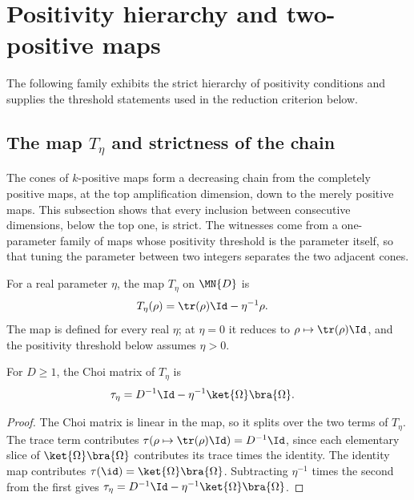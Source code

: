 \section{Positivity hierarchy and two-positive maps}

The following family exhibits the strict hierarchy of positivity conditions
and supplies the threshold statements used in the reduction criterion below.

\subsection{The map \texorpdfstring{$T_\eta$}{T eta} and strictness of the chain}

The cones of $k$-positive maps form a decreasing chain from the completely
positive maps, at the top amplification dimension, down to the merely positive
maps. This subsection shows that every inclusion between consecutive
dimensions, below the top one, is strict. The witnesses come from a
one-parameter family of maps whose positivity threshold is the parameter
itself, so that tuning the parameter between two integers separates the two
adjacent cones.

\begin{definition}
    \label{def:t_eta}
    \leanok
    For a real parameter $\eta$, the map $T_\eta$ on $\MN{D}$ is
    \begin{align}
        T_\eta(\rho) & =\tr(\rho) \Id-\eta^{-1}\rho.
        \notag
    \end{align}
    The map is defined for every real $\eta$; at $\eta=0$ it reduces to
    $\rho\mapsto\tr(\rho) \Id$, and the positivity threshold below
    assumes $\eta>0$.
\end{definition}

\begin{theorem}
    \label{thm:choi_matrix_t_eta}
    \leanok
    For $D\ge 1$, the Choi matrix of $T_\eta$ is
    \begin{align}
        \tau_\eta & =D^{-1}\Id-\eta^{-1}\ket{\Omega}\bra{\Omega}.
        \notag
    \end{align}
\end{theorem}

\begin{proof}
    \leanok
    The Choi matrix is linear in the map, so it splits over the two terms of
    $T_\eta$. The trace term contributes
    $\tau(\rho\mapsto\tr(\rho) \Id)=D^{-1}\Id$, since each elementary
    slice of $\ket{\Omega}\bra{\Omega}$ contributes its trace times the identity.
    The identity map contributes
    $\tau(\id)=\ket{\Omega}\bra{\Omega}$. Subtracting $\eta^{-1}$ times the
    second from the first gives
    $\tau_\eta=D^{-1}\Id-\eta^{-1}\ket{\Omega}\bra{\Omega}$.
\end{proof}

